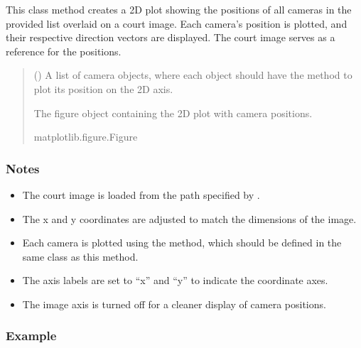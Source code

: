 \documentclass[letterpaper,10pt,english]{sphinxmanual}
\begin{document}
\begin{fulllineitems}
\begin{fulllineitems}
\sphinxAtStartPar
This class method creates a 2D plot showing the positions of all cameras in the
provided list overlaid on a court image. Each camera’s position is plotted, and
their respective direction vectors are displayed. The court image serves as a
reference for the positions.
\begin{quote}\begin{description}
\sphinxAtStartPar
{} () \textendash{} A list of camera objects, where each object should have the  method to plot its position on the 2D axis.

\sphinxAtStartPar
The figure object containing the 2D plot with camera positions.

\sphinxAtStartPar
matplotlib.figure.Figure

\end{description}\end{quote}
\subsubsection*{Notes}
\begin{itemize}
\item {} 
\sphinxAtStartPar
The court image is loaded from the path specified by .

\item {} 
\sphinxAtStartPar
The x and y coordinates are adjusted to match the dimensions of the image.

\item {} 
\sphinxAtStartPar
Each camera is plotted using the  method, which should be defined in the same class as this method.

\item {} 
\sphinxAtStartPar
The axis labels are set to “x” and “y” to indicate the coordinate axes.

\item {} 
\sphinxAtStartPar
The image axis is turned off for a cleaner display of camera positions.

\end{itemize}
\subsubsection*{Example}


\end{fulllineitems}
\end{fulllineitems}
\end{document}
